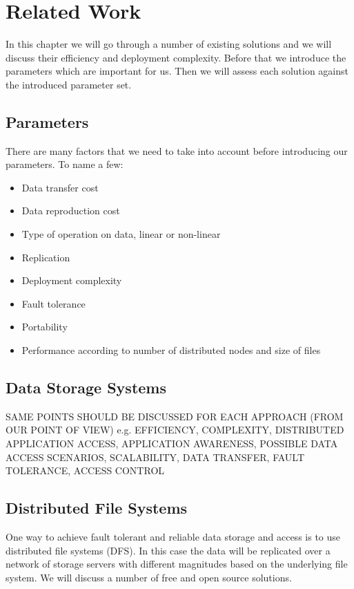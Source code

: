 \chapter{Related Work}
\label{cha:literature}

In this chapter we will go through a number of existing solutions and we will 
discuss their efficiency and deployment complexity. Before that we introduce the
parameters which are important for us. Then we will assess each solution against the
introduced parameter set.

\section{Parameters}
There are many factors that we need to take into account before introducing our parameters. To name a few:

\begin{itemize}
\item Data transfer cost
\item Data reproduction cost
\item Type of operation on data, linear or non-linear
\item Replication
\item Deployment complexity
\item Fault tolerance
\item Portability
\item Performance according to number of distributed nodes and size of files
\end{itemize}

\section{Data Storage Systems}
\label{sec:datastoragesystems}

SAME POINTS SHOULD BE DISCUSSED FOR EACH APPROACH (FROM OUR POINT OF VIEW) 
e.g. EFFICIENCY, COMPLEXITY, DISTRIBUTED APPLICATION ACCESS, APPLICATION AWARENESS,
POSSIBLE DATA ACCESS SCENARIOS, SCALABILITY, DATA TRANSFER, FAULT TOLERANCE, 
ACCESS CONTROL 


\section{Distributed File Systems}
One way to achieve fault tolerant and reliable data storage and access is to use
distributed file systems (DFS). In this case the data will be replicated over a
network of storage servers with different magnitudes based on the underlying file
system. We will discuss a number of free and open source solutions.

